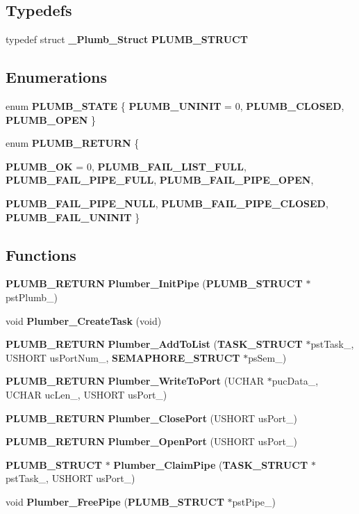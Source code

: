 \subsection*{Typedefs}
\begin{DoxyCompactItemize}
\item 
typedef struct {\bf \_\-Plumb\_\-Struct} {\bf PLUMB\_\-STRUCT}
\end{DoxyCompactItemize}
\subsection*{Enumerations}
\begin{DoxyCompactItemize}
\item 
enum {\bf PLUMB\_\-STATE} \{ {\bf PLUMB\_\-UNINIT} =  0, 
{\bf PLUMB\_\-CLOSED}, 
{\bf PLUMB\_\-OPEN}
 \}
\item 
enum {\bf PLUMB\_\-RETURN} \{ \par
{\bf PLUMB\_\-OK} =  0, 
{\bf PLUMB\_\-FAIL\_\-LIST\_\-FULL}, 
{\bf PLUMB\_\-FAIL\_\-PIPE\_\-FULL}, 
{\bf PLUMB\_\-FAIL\_\-PIPE\_\-OPEN}, 
\par
{\bf PLUMB\_\-FAIL\_\-PIPE\_\-NULL}, 
{\bf PLUMB\_\-FAIL\_\-PIPE\_\-CLOSED}, 
{\bf PLUMB\_\-FAIL\_\-UNINIT}
 \}
\end{DoxyCompactItemize}
\subsection*{Functions}
\begin{DoxyCompactItemize}
\item 
{\bf PLUMB\_\-RETURN} {\bf Plumber\_\-InitPipe} ({\bf PLUMB\_\-STRUCT} $\ast$pstPlumb\_\-)
\item 
void {\bf Plumber\_\-CreateTask} (void)
\item 
{\bf PLUMB\_\-RETURN} {\bf Plumber\_\-AddToList} ({\bf TASK\_\-STRUCT} $\ast$pstTask\_\-, USHORT usPortNum\_\-, {\bf SEMAPHORE\_\-STRUCT} $\ast$psSem\_\-)
\item 
{\bf PLUMB\_\-RETURN} {\bf Plumber\_\-WriteToPort} (UCHAR $\ast$pucData\_\-, UCHAR ucLen\_\-, USHORT usPort\_\-)
\item 
{\bf PLUMB\_\-RETURN} {\bf Plumber\_\-ClosePort} (USHORT usPort\_\-)
\item 
{\bf PLUMB\_\-RETURN} {\bf Plumber\_\-OpenPort} (USHORT usPort\_\-)
\item 
{\bf PLUMB\_\-STRUCT} $\ast$ {\bf Plumber\_\-ClaimPipe} ({\bf TASK\_\-STRUCT} $\ast$pstTask\_\-, USHORT usPort\_\-)
\item 
void {\bf Plumber\_\-FreePipe} ({\bf PLUMB\_\-STRUCT} $\ast$pstPipe\_\-)
\end{DoxyCompactItemize}


